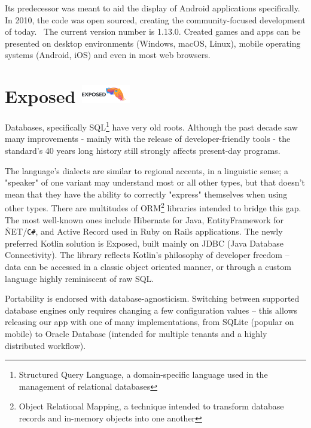 Its predecessor was meant to aid the display of Android applications specifically. In 2010, the code was open sourced, creating the community-focused development of today.~\cite{LibgdxHistory} The current version number is 1.13.0. Created games and apps can be presented on desktop environments (Windows, macOS, Linux), mobile operating systems (Android, iOS) and even in most web browsers.

\section{Exposed {\hspace{1cm}\includegraphics[height=8mm, keepaspectratio]{images/exposed_logo.png}}}

Databases, specifically SQL\footnote{Structured Query Language, a domain-specific language used in the management of relational databases} have very old roots. Although the past decade saw many improvements - mainly with the release of developer-friendly tools - the standard's 40 years long history still strongly affects present-day programs.


The language's dialects are similar to regional accents, in a linguistic sense; a "speaker" of one variant may understand most or all other types, but that doesn't mean that they have the ability to correctly "express" themselves when using other types. There are multitudes of ORM\footnote{Object Relational Mapping, a technique intended to transform database records and in-memory objects into one another} libraries intended to bridge this gap. The most well-known ones include Hibernate for Java, EntityFramework for \.NET/\texttt{C\#}, and Active Record used in Ruby on Rails applications. The newly preferred Kotlin solution is Exposed, built mainly on JDBC (Java Database Connectivity). The library reflects Kotlin's philosophy of developer freedom -- data can be accessed in a classic object oriented manner, or through a custom language highly reminiscent of raw SQL.~\cite{ExposedDocs}


Portability is endorsed with database-agnosticism. Switching between supported database engines only requires changing a few configuration values -- this allows releasing our app with one of many implementations, from SQLite (popular on mobile) to Oracle Database (intended for multiple tenants and a highly distributed workflow).

